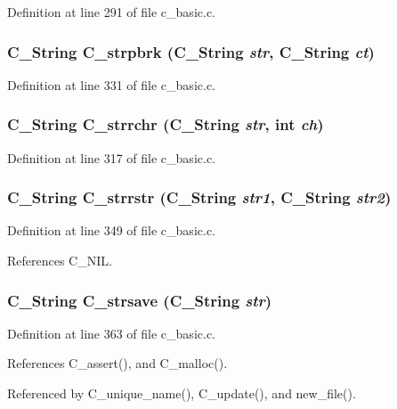 Definition at line 291 of file c\_\-basic.c.
\subsubsection{\setlength{\rightskip}{0pt plus 5cm}\bf{C\_\-String} C\_\-strpbrk (\bf{C\_\-String} {\em str}, \bf{C\_\-String} {\em ct})}\label{c__basic_8h_e1733cec138a6ba318b540e28a67b43f}




Definition at line 331 of file c\_\-basic.c.
\subsubsection{\setlength{\rightskip}{0pt plus 5cm}\bf{C\_\-String} C\_\-strrchr (\bf{C\_\-String} {\em str}, int {\em ch})}\label{c__basic_8h_95e35beafad545589468e9f746075e32}




Definition at line 317 of file c\_\-basic.c.
\subsubsection{\setlength{\rightskip}{0pt plus 5cm}\bf{C\_\-String} C\_\-strrstr (\bf{C\_\-String} {\em str1}, \bf{C\_\-String} {\em str2})}\label{c__basic_8h_1c8039736bc536e997c59ffc305f80d8}




Definition at line 349 of file c\_\-basic.c.

References C\_\-NIL.
\subsubsection{\setlength{\rightskip}{0pt plus 5cm}\bf{C\_\-String} C\_\-strsave (\bf{C\_\-String} {\em str})}\label{c__basic_8h_c8864a457873c4ff942a2e87ea91f349}




Definition at line 363 of file c\_\-basic.c.

References C\_\-assert(), and C\_\-malloc().

Referenced by C\_\-unique\_\-name(), C\_\-update(), and new\_\-file().
